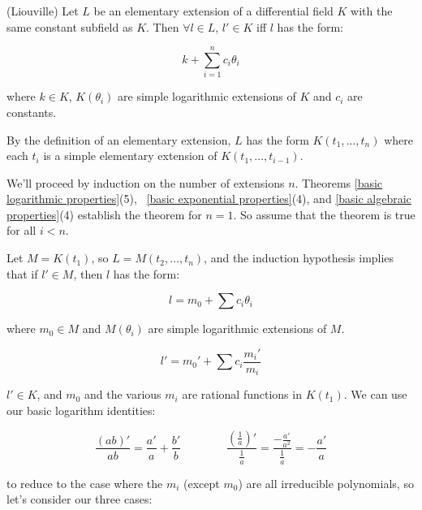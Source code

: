 \theorem\label{weak Liouville theorem} (Liouville)
Let $L$ be an elementary extension of a differential field $K$ with
the same constant subfield as $K$.  Then $\forall l \in L$, $l' \in K$
iff $l$ has the form:

$$k + \sum_{i=1}^n c_i \theta_i$$

where $k\in K$, $K(\theta_i)$ are simple logarithmic extensions of $K$ and $c_i$
are constants.

\proof

By the definition of an elementary extension, $L$ has the form $K(t_1,\ldots,t_n)$
where each $t_i$ is a simple elementary extension of $K(t_1,\ldots,t_{i-1})$.

We'll proceed by induction on the number of extensions $n$.  Theorems \ref{basic logarithmic properties}(5),
\ \ref{basic exponential properties}(4), and \ref{basic algebraic properties}(4)
establish the theorem for $n=1$.  So assume that the theorem is true
for all $i<n$.

Let $M = K(t_1)$, so $L = M(t_2,\ldots,t_n)$,
and the induction hypothesis implies that if $l' \in M$,
then $l$ has the form:

$$l = m_0 + \sum c_i \theta_i$$

where $m_0 \in M$ and $M(\theta_i)$ are simple logarithmic extensions of $M$.

$$l' = m_0' + \sum c_i \frac{m_i'}{m_i}$$

$l' \in K$, and $m_0$ and the various $m_i$ are rational
functions in $K(t_1)$.  We can use our basic logarithm identities:

$$\frac{(ab)'}{ab} = \frac{a'}{a} + \frac{b'}{b} \qquad\qquad
\frac{(\frac{1}{a})'}{\frac{1}{a}} = \frac{-\frac{a'}{a^2}}{\frac{1}{a}} = - \frac{a'}{a}$$

to reduce to the case where the $m_i$ (except $m_0$) are all irreducible
polynomials, so let's consider our three cases:

